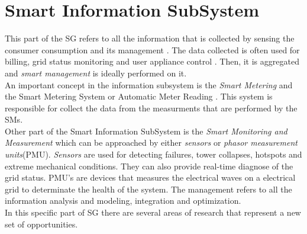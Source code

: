 \section{Smart Information SubSystem}
This part of the SG refers to all the information that is collected by sensing the consumer consumption and its management . The data collected is often used for billing, grid status monitoring and user appliance control \cite{journals/comsur/FangMXY12}. Then, it is aggregated and \textit{smart management} is ideally performed on it.\\
An important concept in the information subsystem  is the \textit{Smart Metering} and the Smart Metering System or Automatic Meter Reading . This system is responsible for collect the data from the measurments that are performed by the SMs.\\
Other part of the Smart Information SubSystem is the \textit{Smart Monitoring and Measurement} which can be approached by either \textit{sensors} or \textit{phasor measurement units}(PMU). \textit{Sensors} are used for detecting failures, tower collapses, hotspots and extreme mechanical conditions. They can also provide real-time diagnose of the grid status. PMU's are devices that measures the electrical waves on a electrical grid to determinate the health  of the system.
The management refers to all the information analysis and modeling, integration and optimization.\\
In this specific part of SG there are several areas of research that represent a new set of opportunities.


